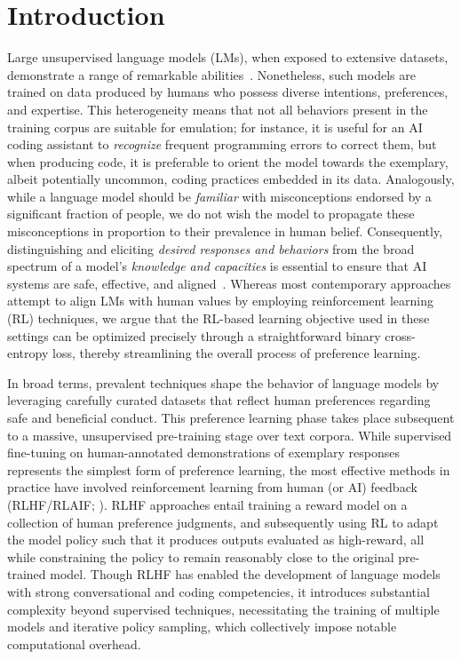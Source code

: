 \section{Introduction}
Large unsupervised language models (LMs), when exposed to extensive datasets, demonstrate a range of remarkable abilities~\citep{chowdhery2022palm, brown2020language, touvron2023llama,bubeck2023sparks}. Nonetheless, such models are trained on data produced by humans who possess diverse intentions, preferences, and expertise. This heterogeneity means that not all behaviors present in the training corpus are suitable for emulation; for instance, it is useful for an AI coding assistant to \textit{recognize} frequent programming errors to correct them, but when producing code, it is preferable to orient the model towards the exemplary, albeit potentially uncommon, coding practices embedded in its data. Analogously, while a language model should be \textit{familiar} with misconceptions endorsed by a significant fraction of people, we do not wish the model to propagate these misconceptions in proportion to their prevalence in human belief. Consequently, distinguishing and eliciting \emph{desired responses and behaviors} from the broad spectrum of a model’s \textit{knowledge and capacities} is essential to ensure that AI systems are safe, effective, and aligned~\citep{ouyang2022training}. Whereas most contemporary approaches attempt to align LMs with human values by employing reinforcement learning (RL) techniques, we argue that the RL-based learning objective used in these settings can be optimized precisely through a straightforward binary cross-entropy loss, thereby streamlining the overall process of preference learning.

In broad terms, prevalent techniques shape the behavior of language models by leveraging carefully curated datasets that reflect human preferences regarding safe and beneficial conduct. This preference learning phase takes place subsequent to a massive, unsupervised pre-training stage over text corpora. While supervised fine-tuning on human-annotated demonstrations of exemplary responses represents the simplest form of preference learning, the most effective methods in practice have involved reinforcement learning from human (or AI) feedback (RLHF/RLAIF; \citep{christiano2017deep,bai2022constitutional}). RLHF approaches entail training a reward model on a collection of human preference judgments, and subsequently using RL to adapt the model policy such that it produces outputs evaluated as high-reward, all while constraining the policy to remain reasonably close to the original pre-trained model. Though RLHF has enabled the development of language models with strong conversational and coding competencies, it introduces substantial complexity beyond supervised techniques, necessitating the training of multiple models and iterative policy sampling, which collectively impose notable computational overhead.

